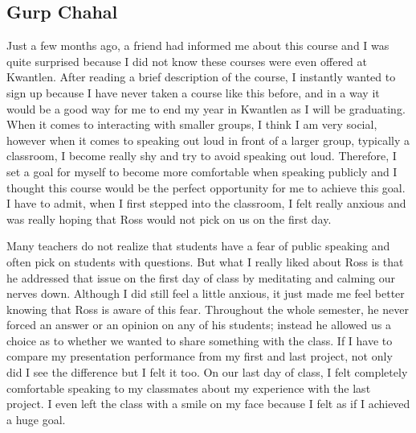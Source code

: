 \documentclass[letterpaper,10pt,headsepline]{scrreprt}
\begin{document}
\subsection{Gurp Chahal}

Just a few months ago, a friend had informed me about this course and I was quite surprised because I did not know these courses were even offered at Kwantlen. After reading a brief description of the course, I instantly wanted to sign up because I have never taken a course like this before, and in a way it would be a good way for me to end my year in Kwantlen as I will be graduating. When it comes to interacting with smaller groups, I think I am very social, however when it comes to speaking out loud in front of a larger group, typically a classroom, I become really shy and try to avoid speaking out loud. Therefore, I set a goal for myself to become more comfortable when speaking publicly and I thought this course would be the perfect opportunity for me to achieve this goal. I have to admit, when I first stepped into the classroom, I felt really anxious and was really hoping that Ross would not pick on us on the first day.

Many teachers do not realize that students have a fear of public speaking and often pick on students with questions. But what I really liked about Ross is that he addressed that issue on the first day of class by meditating and calming our nerves down. Although I did still feel a little anxious, it just made me feel better knowing that Ross is aware of this fear. Throughout the whole semester, he never forced an answer or an opinion on any of his students; instead he allowed us a choice as to whether we wanted to share something with the class. If I have to compare my presentation performance from my first and last project, not only did I see the difference but I felt it too. On our last day of class, I felt completely comfortable speaking to my classmates about my experience with the last project. I even left the class with a smile on my face because I felt as if I achieved a huge goal.
\end{document}
